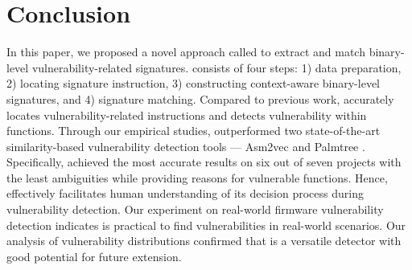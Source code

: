 \section{Conclusion}
\label{sec:ccln}

In this paper, we proposed a novel approach called \name to extract and match binary-level vulnerability-related signatures. 
\name consists of four steps: 1) data preparation, 2) locating signature instruction, 3) constructing context-aware binary-level signatures, and 4) signature matching. 
Compared to previous work, \name accurately locates vulnerability-related instructions and detects vulnerability within functions. 
Through our empirical studies, \name outperformed two state-of-the-art similarity-based vulnerability detection tools --- Asm2vec \cite{asm2vec} and Palmtree \cite{Palmtree}.
Specifically, \name achieved the most accurate results on six out of seven projects with the least ambiguities while providing reasons for vulnerable functions. 
Hence, \name effectively facilitates human understanding of its decision process during vulnerability detection. 
Our experiment on real-world firmware vulnerability detection indicates \name is practical to find vulnerabilities in real-world scenarios.
Our analysis of vulnerability distributions confirmed that \name is a versatile detector with good potential for future extension. 
